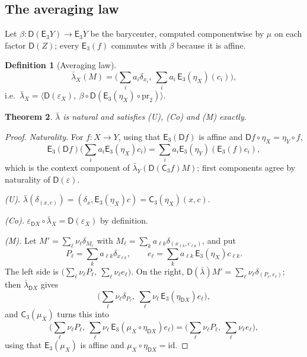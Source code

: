 \documentclass[11pt]{article}
\newtheorem{theorem}{Theorem}[section]
\theoremstyle{definition}
\newtheorem{definition}[theorem]{Definition}
\theoremstyle{remark}
\newcommand{\D}{\mathsf{D}}
\newcommand{\C}{\mathsf{C}}
\newcommand{\E}{\mathsf{E}}
\newcommand{\id}{\mathrm{id}}
\newcommand{\lb}{\bar\lambda}
\begin{document}
\subsection{The averaging law}

Let $\beta\colon\D(\E_3Y)\to\E_3Y$ be the barycenter, computed componentwise by $\mu$ on each factor
$\D(Z)$; every $\E_3(f)$ commutes with $\beta$ because it is affine.

\begin{definition}[Averaging law]
\[
\lb_X(M)=\Big(\sum_ia_i\delta_{x_i},\ \sum_ia_i\,\E_3(\eta_X)(c_i)\Big),
\]
i.e.\ $\lb_X=\big\langle\D(\varepsilon_X),\ \beta\circ\D(\E_3(\eta_X)\circ\mathrm{pr}_2)\big\rangle$.
\end{definition}

\begin{theorem}\label{thm:avg}
$\lb$ is natural and satisfies (U), (Co) and (M) exactly.
\end{theorem}
\begin{proof}
\emph{Naturality.} For $f\colon X\to Y$, using that $\E_3(\D f)$ is affine and
$\D f\circ\eta_X=\eta_Y\circ f$,
\[
\E_3(\D f)\Big(\sum_ia_i\E_3(\eta_X)c_i\Big)=\sum_ia_i\E_3(\eta_Y)(\E_3(f)c_i),
\]
which is the context component of $\lb_Y(\D(\C_3f)M)$; first components agree by naturality of
$\D(\varepsilon)$.

\emph{(U).} $\lb(\delta_{(x,c)})=(\delta_x,\E_3(\eta_X)c)=\C_3(\eta_X)(x,c)$.

\emph{(Co).} $\varepsilon_{\D X}\circ\lb_X=\D(\varepsilon_X)$ by definition.

\emph{(M).} Let $M'=\sum_\ell\nu_\ell\delta_{M_\ell}$ with
$M_\ell=\sum_ka_{\ell k}\delta_{(x_{\ell k},c_{\ell k})}$, and put
\[
P_\ell=\sum_ka_{\ell k}\delta_{x_{\ell k}},\qquad e_\ell=\sum_ka_{\ell k}\,\E_3(\eta_X)c_{\ell k}.
\]
The left side is
$\big(\sum_\ell\nu_\ell P_\ell,\ \sum_\ell\nu_\ell e_\ell\big)$. On the right,
$\D(\lb)M'=\sum_\ell\nu_\ell\delta_{(P_\ell,e_\ell)}$; then $\lb_{\D X}$ gives
\[
\Big(\sum_\ell\nu_\ell\delta_{P_\ell},\ \sum_\ell\nu_\ell\,\E_3(\eta_{\D X})e_\ell\Big),
\]
and $\C_3(\mu_X)$ turns this into
\[
\Big(\sum_\ell\nu_\ell P_\ell,\ \sum_\ell\nu_\ell\,\E_3(\mu_X\circ\eta_{\D X})e_\ell\Big)
=\Big(\sum_\ell\nu_\ell P_\ell,\ \sum_\ell\nu_\ell e_\ell\Big),
\]
using that $\E_3(\mu_X)$ is affine and $\mu_X\circ\eta_{\D X}=\id$.
\end{proof}
\end{document}
